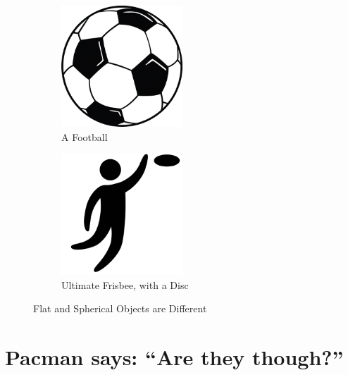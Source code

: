 \documentclass{article}
\begin{document}
\begin{figure}
  \begin{subfigure}{0.5\textwidth}
    \centering
    \includegraphics[width=0.5\textwidth]{images/football.png}
    \caption{A Football}
    \label{fig:football}
  \end{subfigure}
  \begin{subfigure}{0.5\textwidth}
    \centering
    \includegraphics[width=0.5\textwidth]{images/frisbee.png}
    \caption{Ultimate Frisbee, with a Disc}
    \label{fig:frisbee}
  \end{subfigure}
  \caption{Flat and Spherical Objects are Different}
\end{figure}
\section{Pacman says: ``Are they though?''}
\begin{figure}[H]
\end{figure}
\end{document}
